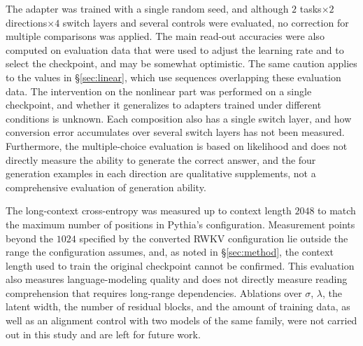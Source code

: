 \documentclass[conference]{IEEEtran}
\begin{document}
The adapter was trained with a single random seed, and although $2$ tasks$\times2$ directions$\times4$ switch layers and several
controls were evaluated, no correction for multiple comparisons was applied. The main read-out accuracies were also computed on
evaluation data that were used to adjust the learning rate and to select the checkpoint, and may be somewhat optimistic. The same
caution applies to the values in \S\ref{sec:linear}, which use sequences overlapping these evaluation data.
The intervention on the nonlinear part was performed on a single checkpoint, and whether it generalizes to adapters trained under
different conditions is unknown.
Each composition also has a single switch layer, and how conversion error accumulates over several switch layers has not been
measured. Furthermore, the multiple-choice evaluation is based on likelihood and does not directly measure the ability to generate the correct
answer, and the four generation examples in each direction are qualitative supplements, not a comprehensive evaluation of generation
ability.

The long-context cross-entropy was measured up to context length $2048$ to match the maximum number of positions in Pythia's configuration.
Measurement points beyond the $1024$ specified by the converted RWKV configuration lie outside the range the configuration assumes, and,
as noted in \S\ref{sec:method}, the context length used to train the original checkpoint cannot be confirmed.
This evaluation also measures language-modeling quality and does not directly measure reading comprehension that requires long-range
dependencies. Ablations over $\sigma$, $\lambda$, the latent width, the number of residual blocks, and the amount of training data, as
well as an alignment control with two models of the same family, were not carried out in this study and are left
for future work.
\end{document}
